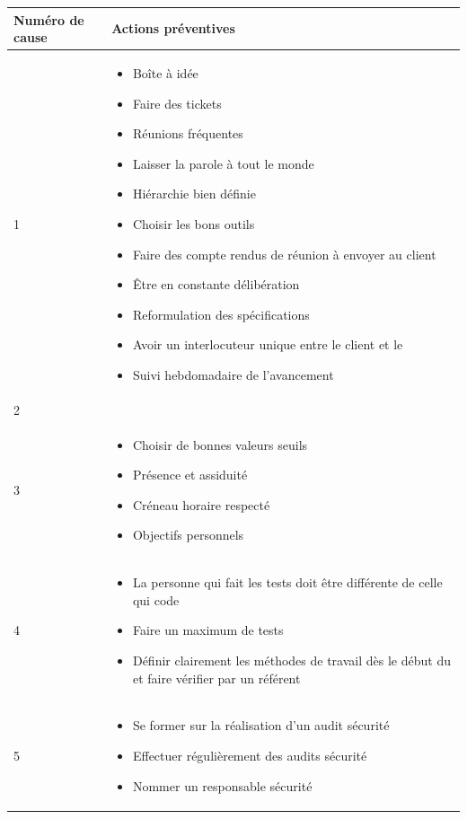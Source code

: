 \centering
	\begin{longtable}{|p{7cm}|p{7cm}|}
	\hline
	\rowcolor{gray!40} Numéro de cause & Actions préventives \\
	\hline
	 1 & \begin{itemize}
	 	\item Boîte à idée
	 	\item Faire des tickets
	 	\item Réunions fréquentes
	 	\item Laisser la parole à tout le monde
	 	\item Hiérarchie bien définie
	 	\item Choisir les bons outils
	 	\item Faire des compte rendus de réunion à envoyer au client
	 	\item Être en constante délibération
	 	\item Reformulation des spécifications
	 	\item Avoir un interlocuteur unique entre le client et le \PICCourt
	 	\item Suivi hebdomadaire de l'avancement
	 \end{itemize} \\
	\hline
	2 & \\
	\hline
	3 & \begin{itemize}
		\item Choisir de bonnes valeurs seuils
		\item Présence et assiduité
		\item Créneau horaire respecté
		\item Objectifs personnels
	\end{itemize} \\
	\hline
	4 & \begin{itemize}
		\item La personne qui fait les tests doit être différente de celle qui code
		\item Faire un maximum de tests
		\item Définir clairement les méthodes de travail dès le début du \PICCourt et faire vérifier par un référent
	\end{itemize} \\
	\hline
	5 & \begin{itemize}
		\item Se former sur la réalisation d'un audit sécurité
		\item Effectuer régulièrement des audits sécurité
		\item Nommer un responsable sécurité

\end{itemize}
\end{longtable}
